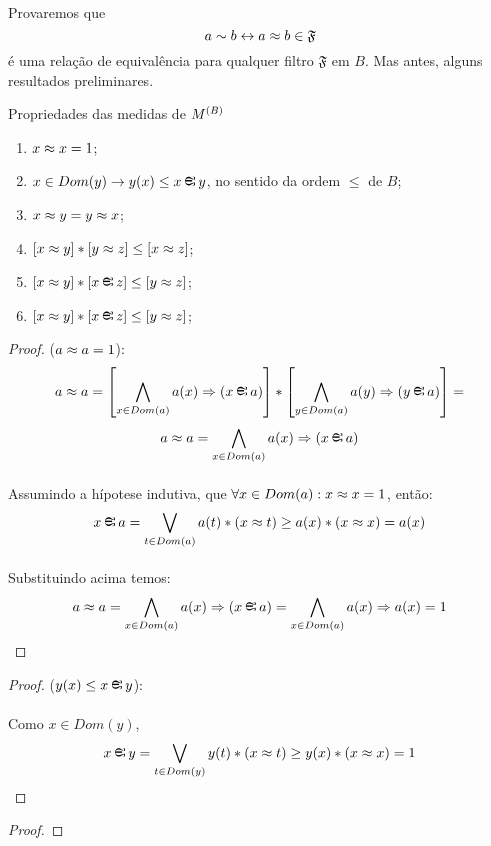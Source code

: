     \paragraph{}
        Provaremos que
    $$ a \sim b \leftrightarrow a\approx b \in \mathfrak{F}$$ 
    é uma relação de equivalência para qualquer filtro $\mathfrak{F}$ em $B$. Mas antes, alguns resultados preliminares.
    \begin{proposition}{Propriedades das medidas de $M^{(B)}$}
        \begin{enumerate}
            \item $ x\approx x = 1$;
            \item $ x\in Dom(y) \rar y(x) \leq x\Min y$, no sentido da ordem $\leq$ de $B$;
            \item $ x\approx y = y \approx x$;
            \item $[x\approx y] * [y\approx z] \leq [x\approx z]$;
            \item $[x\Meq y] * [x\Min z] \leq [y\Meq z]$;
            \item $[x\Meq y] * [x\Min z] \leq [y\Meq z]$;
        \end{enumerate}
        \begin{proof}

            ($ a\approx a = 1$):
            $$a\Meq a = \left[\bigwedge_{x\in Dom(a)}a(x)\RAR (x\Min a)\right]*\left[\bigwedge_{y\in Dom(a)}a(y)\RAR (y\Min a)\right] = $$
            $$a\Meq a = \bigwedge_{x\in Dom(a)}a(x)\RAR (x\Min a)$$
            \paragraph{}
                Assumindo a hípotese indutiva, que $\forall x\in Dom(a):x\approx x = 1$, então:
            $$ x\Min a = \bigvee_{t\in Dom(a)} a(t)*(x\Meq t) \geq a(x)*(x\Meq x) = a(x)$$
            \paragraph{}
                Substituindo acima temos:
            $$a\Meq a = \bigwedge_{x\in Dom(a)}a(x)\RAR (x\Min a) = \bigwedge_{x\in Dom(a)}a(x)\RAR a(x) = 1$$\eop
        \end{proof}
        \begin{proof}
            
            ($ y(x) \leq x\Min y$):
            \paragraph{}
                Como $x\in Dom(y)$,
            $$ x\Min y = \bigvee_{t\in Dom(y)} y(t)*(x\Meq t)\geq y(x)*(x\Meq x) = 1$$\eop
        \end{proof}
        \begin{proof}
            

\end{proof}
\end{proposition}
